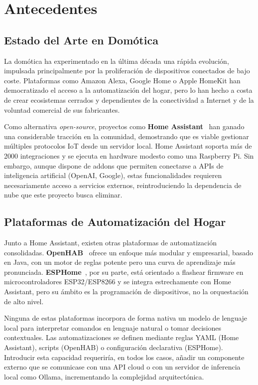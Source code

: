 \chapter{Antecedentes}
\label{cap:antecedentes}

\section{Estado del Arte en Domótica}

La domótica ha experimentado en la última década una rápida evolución, impulsada principalmente por la proliferación de dispositivos conectados de bajo coste. Plataformas como Amazon Alexa, Google Home o Apple HomeKit han democratizado el acceso a la automatización del hogar, pero lo han hecho a costa de crear ecosistemas cerrados y dependientes de la conectividad a Internet y de la voluntad comercial de sus fabricantes.

Como alternativa \textit{open-source}, proyectos como \textbf{Home Assistant}~\cite{home_assistant_2019} han ganado una considerable tracción en la comunidad, demostrando que es viable gestionar múltiples protocolos IoT desde un servidor local. Home Assistant soporta más de 2000 integraciones y se ejecuta en hardware modesto como una Raspberry Pi. Sin embargo, aunque dispone de addons que permiten conectarse a APIs de inteligencia artificial (OpenAI, Google), estas funcionalidades requieren necesariamente acceso a servicios externos, reintroduciendo la dependencia de nube que este proyecto busca eliminar.

\section{Plataformas de Automatización del Hogar}

Junto a Home Assistant, existen otras plataformas de automatización consolidadas. \textbf{OpenHAB}~\cite{openhab} ofrece un enfoque más modular y empresarial, basado en Java, con un motor de reglas potente pero una curva de aprendizaje más pronunciada. \textbf{ESPHome}~\cite{esphome}, por su parte, está orientado a flashear firmware en microcontroladores ESP32/ESP8266 y se integra estrechamente con Home Assistant, pero su ámbito es la programación de dispositivos, no la orquestación de alto nivel.

Ninguna de estas plataformas incorpora de forma nativa un modelo de lenguaje local para interpretar comandos en lenguaje natural o tomar decisiones contextuales. Las automatizaciones se definen mediante reglas YAML (Home Assistant), scripts (OpenHAB) o configuración declarativa (ESPHome). Introducir esta capacidad requeriría, en todos los casos, añadir un componente externo que se comunicase con una API cloud o con un servidor de inferencia local como Ollama, incrementando la complejidad arquitectónica.

